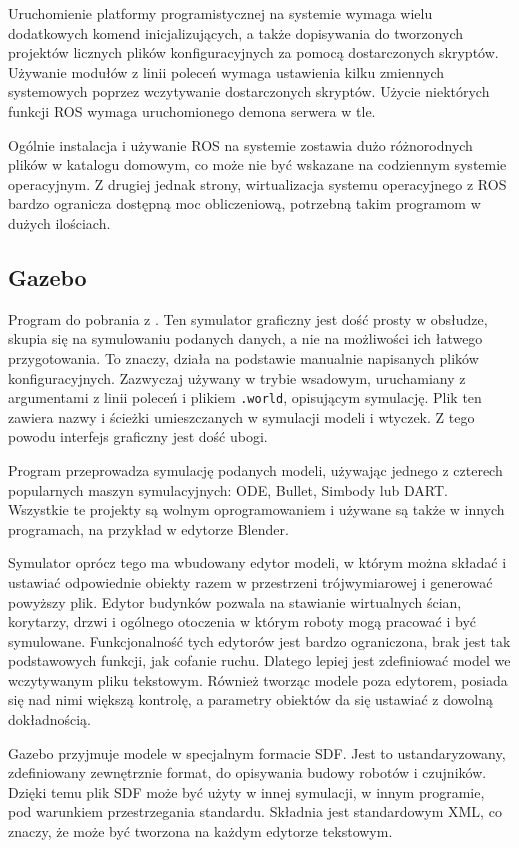 	Uruchomienie platformy programistycznej na systemie wymaga wielu dodatkowych komend inicjalizujących, 
	a także dopisywania do tworzonych projektów licznych plików konfiguracyjnych za pomocą dostarczonych skryptów.
	Używanie modułów z linii poleceń wymaga ustawienia kilku zmiennych systemowych poprzez wczytywanie dostarczonych skryptów.
	Użycie niektórych funkcji ROS wymaga uruchomionego demona serwera w tle.

	Ogólnie instalacja i używanie ROS na systemie zostawia dużo różnorodnych plików w katalogu domowym, co może nie być wskazane na codziennym systemie operacyjnym.
	Z drugiej jednak strony, wirtualizacja systemu operacyjnego z ROS bardzo ogranicza dostępną moc obliczeniową, potrzebną takim programom w dużych ilościach.

	\subsection{Gazebo}
	Program do pobrania z \cite{gazebo_website}. 
	Ten symulator graficzny jest dość prosty w obsłudze, skupia się na symulowaniu podanych danych, a nie na możliwości ich łatwego przygotowania.
	To znaczy, działa na podstawie manualnie napisanych plików konfiguracyjnych.
	Zazwyczaj używany w trybie wsadowym, uruchamiany z argumentami z linii poleceń i plikiem \texttt{.world}, opisującym symulację.
	Plik ten zawiera nazwy i ścieżki umieszczanych w symulacji modeli i wtyczek.
	Z tego powodu interfejs graficzny jest dość ubogi.

	Program przeprowadza symulację podanych modeli, używając jednego z czterech popularnych maszyn symulacyjnych: ODE, Bullet, Simbody lub DART.
	Wszystkie te projekty są wolnym oprogramowaniem i używane są także w innych programach, na przykład w edytorze Blender.

	Symulator oprócz tego ma wbudowany edytor modeli, w którym można składać i ustawiać odpowiednie obiekty razem w przestrzeni trójwymiarowej
	i generować powyższy plik.
	Edytor budynków pozwala na stawianie wirtualnych ścian, korytarzy, drzwi i ogólnego otoczenia w którym roboty mogą pracować i być symulowane.
	Funkcjonalność tych edytorów jest bardzo ograniczona, brak jest tak podstawowych funkcji, jak cofanie ruchu.
	Dlatego lepiej jest zdefiniować model we wczytywanym pliku tekstowym.
	Również tworząc modele poza edytorem, posiada się nad nimi większą kontrolę, a parametry obiektów da się ustawiać z dowolną dokładnością.

	Gazebo przyjmuje modele w specjalnym formacie SDF. Jest to ustandaryzowany, zdefiniowany zewnętrznie format, do opisywania budowy robotów i czujników.
	Dzięki temu plik SDF może być użyty w innej symulacji, w innym programie, pod warunkiem przestrzegania standardu.
	Składnia jest standardowym XML, co znaczy, że może być tworzona na każdym edytorze tekstowym.

